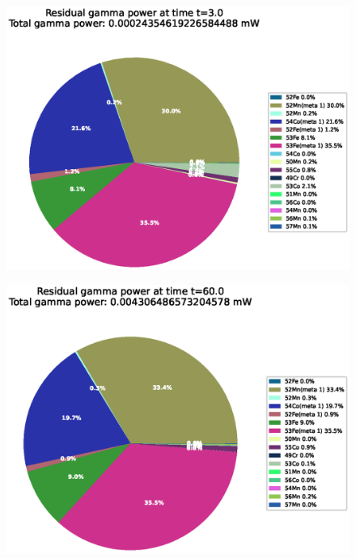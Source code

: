 \FloatBarrier


\begin{figure}[!htb]
\centering
\includegraphics[width=0.8\linewidth]{chapters/results_activity_code/fe-activity-v2/residual-energy/0001_3.eps}
\caption{}
\label{fig:activity-v2-residual-power-3s}
\end{figure}

\begin{figure}[!htb]
\centering
\includegraphics[width=0.8\linewidth]{chapters/results_activity_code/fe-activity-v2/residual-energy/0020_60.eps}
\caption{}
\label{fig:activity-v2-residual-power-60s}
\end{figure}

